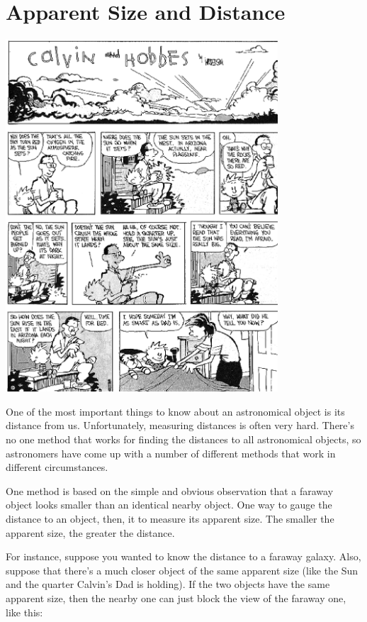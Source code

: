 \section{Apparent Size and Distance}

\vspace{0.5in}
\centerline{\includegraphics[width=4in]{localdistance/calvin-sun.eps}}
\vspace{0.5in}

One of the most important things to know about an astronomical
object is its distance from us.  Unfortunately, measuring distances
is often very hard.  There's no one method that works for
finding the distances to all astronomical objects, so 
astronomers have come up with a number of different
methods that work in different circumstances.

One method is based on the simple and obvious observation that a 
faraway object looks smaller than an identical nearby object.
One way to gauge the distance to an object, then, it to measure
its apparent size.  The smaller the apparent size, the greater
the distance.

For instance, suppose you wanted to know the distance to a faraway
galaxy.  Also, suppose that there's a much closer object of the
same apparent size (like the Sun and the quarter Calvin's Dad is holding).
If the two objects have the same apparent size, then the nearby one
can just block the view of the faraway one, like this:

